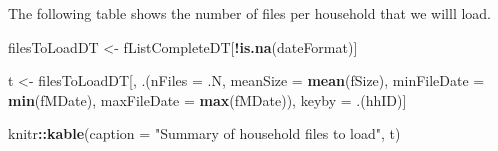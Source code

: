 \documentclass[]{article}
\newenvironment{Shaded}{\begin{snugshade}}{\end{snugshade}}
\newcommand{\KeywordTok}[1]{\textcolor[rgb]{0.13,0.29,0.53}{\textbf{#1}}}
\newcommand{\DataTypeTok}[1]{\textcolor[rgb]{0.13,0.29,0.53}{#1}}
\newcommand{\StringTok}[1]{\textcolor[rgb]{0.31,0.60,0.02}{#1}}
\newcommand{\OperatorTok}[1]{\textcolor[rgb]{0.81,0.36,0.00}{\textbf{#1}}}
\newcommand{\NormalTok}[1]{#1}
\begin{document}
The following table shows the number of files per household that we
willl load.

\begin{Shaded}
\begin{Highlighting}[]
\NormalTok{filesToLoadDT <-}\StringTok{ }\NormalTok{fListCompleteDT[}\OperatorTok{!}\KeywordTok{is.na}\NormalTok{(dateFormat)]}

\NormalTok{t <-}\StringTok{ }\NormalTok{filesToLoadDT[, .(}\DataTypeTok{nFiles =}\NormalTok{ .N,}
                       \DataTypeTok{meanSize =} \KeywordTok{mean}\NormalTok{(fSize),}
                       \DataTypeTok{minFileDate =} \KeywordTok{min}\NormalTok{(fMDate),}
                       \DataTypeTok{maxFileDate =} \KeywordTok{max}\NormalTok{(fMDate)), keyby =}\StringTok{ }\NormalTok{.(hhID)]}

\NormalTok{knitr}\OperatorTok{::}\KeywordTok{kable}\NormalTok{(}\DataTypeTok{caption =} \StringTok{"Summary of household files to load"}\NormalTok{, t)}
\end{Highlighting}
\end{Shaded}
\end{document}
